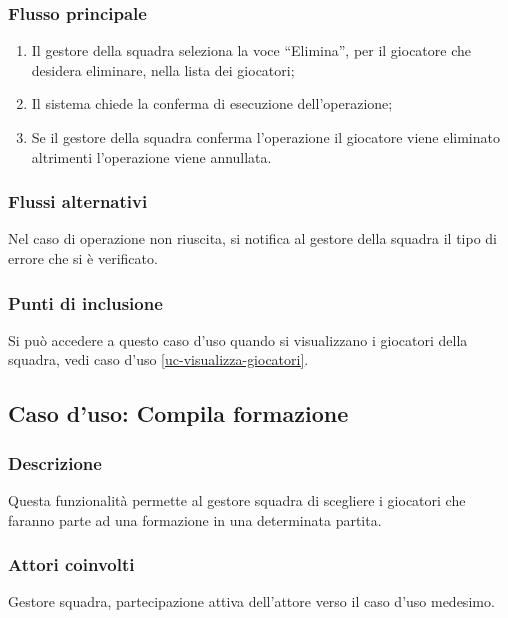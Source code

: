 \subsubsection*{Flusso principale}

\begin{enumerate}
	
	\item
	Il gestore della squadra seleziona la voce ``Elimina'', per il giocatore che desidera eliminare, nella lista dei giocatori;
	
	\item
	Il sistema chiede la conferma di esecuzione dell'operazione;
	
	\item
	Se il gestore della squadra conferma l'operazione il giocatore viene eliminato altrimenti l'operazione viene annullata.
	
\end{enumerate}

\subsubsection*{Flussi alternativi}
Nel caso di operazione non riuscita, si notifica al gestore della squadra il tipo di errore che si è verificato.

\subsubsection*{Punti di inclusione}
Si può accedere a questo caso d'uso quando si visualizzano i giocatori della squadra, vedi caso d'uso \vref{uc-visualizza-giocatori}.


%
%
\subsection{Caso d'uso: Compila formazione}

\subsubsection*{Descrizione}
Questa funzionalità permette al gestore squadra di scegliere i giocatori che faranno parte ad una formazione in una determinata partita.

\subsubsection*{Attori coinvolti}
Gestore squadra, partecipazione attiva dell'attore verso il caso d'uso medesimo.

